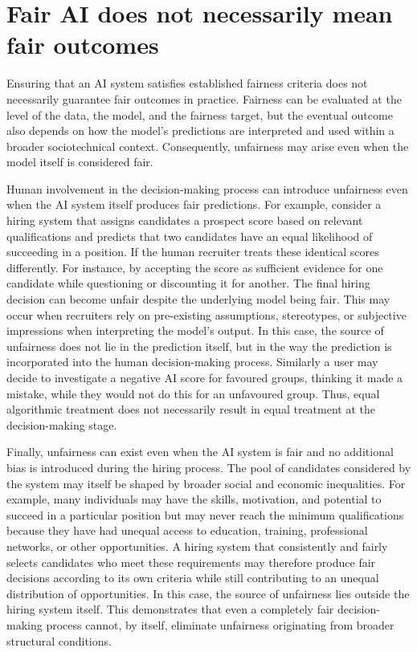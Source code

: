 \section{Fair AI does not necessarily mean fair outcomes}
Ensuring that an AI system satisfies established fairness criteria does not necessarily guarantee fair outcomes in practice. Fairness can be evaluated at the level of the data, the model, and the fairness target, but the eventual outcome also depends on how the model's predictions are interpreted and used within a broader sociotechnical context. Consequently, unfairness may arise even when the model itself is considered fair.

Human involvement in the decision-making process can introduce unfairness even when the AI system itself produces fair predictions. For example, consider a hiring system that assigns candidates a prospect score based on relevant qualifications and predicts that two candidates have an equal likelihood of succeeding in a position. If the human recruiter treats these identical scores differently. For instance, by accepting the score as sufficient evidence for one candidate while questioning or discounting it for another. The final hiring decision can become unfair despite the underlying model being fair. This may occur when recruiters rely on pre-existing assumptions, stereotypes, or subjective impressions when interpreting the model's output. In this case, the source of unfairness does not lie in the prediction itself, but in the way the prediction is incorporated into the human decision-making process. Similarly a user may decide to investigate a negative AI score for favoured groups, thinking it made a mistake, while they would not do this for an unfavoured group. Thus, equal algorithmic treatment does not necessarily result in equal treatment at the decision-making stage.

Finally, unfairness can exist even when the AI system is fair and no additional bias is introduced during the hiring process. The pool of candidates considered by the system may itself be shaped by broader social and economic inequalities. For example, many individuals may have the skills, motivation, and potential to succeed in a particular position but may never reach the minimum qualifications because they have had unequal access to education, training, professional networks, or other opportunities. A hiring system that consistently and fairly selects candidates who meet these requirements may therefore produce fair decisions according to its own criteria while still contributing to an unequal distribution of opportunities. In this case, the source of unfairness lies outside the hiring system itself. This demonstrates that even a completely fair decision-making process cannot, by itself, eliminate unfairness originating from broader structural conditions.

